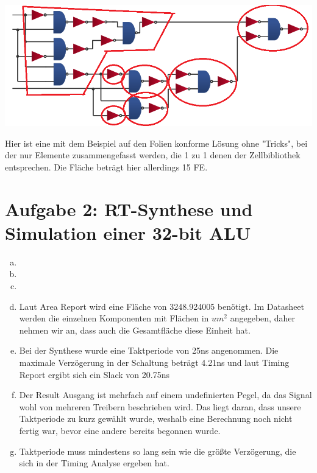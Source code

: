 \documentclass[a4paper]{scrartcl}
\begin{document}
\begin{enumerate}[(a)]
		
\includegraphics[scale=1]{blatt7grafik2.png}		
	
	Hier ist eine mit dem Beispiel auf den Folien konforme Lösung ohne "Tricks", bei der nur Elemente zusammengefasst werden, die 1 zu 1 denen der Zellbibliothek entsprechen. Die Fläche beträgt hier allerdings 15 FE.
		
		
	\end{enumerate}
	\newpage
	\section*{Aufgabe 2: RT-Synthese und Simulation einer 32-bit ALU}
	
	\begin{enumerate}[(a)]
		\item 
		\item 
		\item 
		\item Laut Area Report wird eine Fläche von 3248.924005 benötigt. Im Datasheet werden die einzelnen Komponenten mit Flächen in $um^2$ angegeben, daher nehmen wir an, dass auch die Gesamtfläche diese Einheit hat.
		
		\item Bei der Synthese wurde eine Taktperiode von 25ns angenommen. Die maximale Verzögerung in der Schaltung beträgt 4.21ns und laut Timing Report ergibt sich ein Slack von 20.75ns
		\item Der Result Ausgang ist mehrfach auf einem undefinierten Pegel, da das Signal wohl von mehreren Treibern beschrieben wird. Das liegt daran, dass unsere Taktperiode zu kurz gewählt wurde, weshalb eine Berechnung noch nicht fertig war, bevor eine andere bereits begonnen wurde.
		\item Taktperiode muss mindestens so lang sein wie die größte Verzögerung, die sich in der Timing Analyse ergeben hat.
	\end{enumerate}

	
\end{document}
